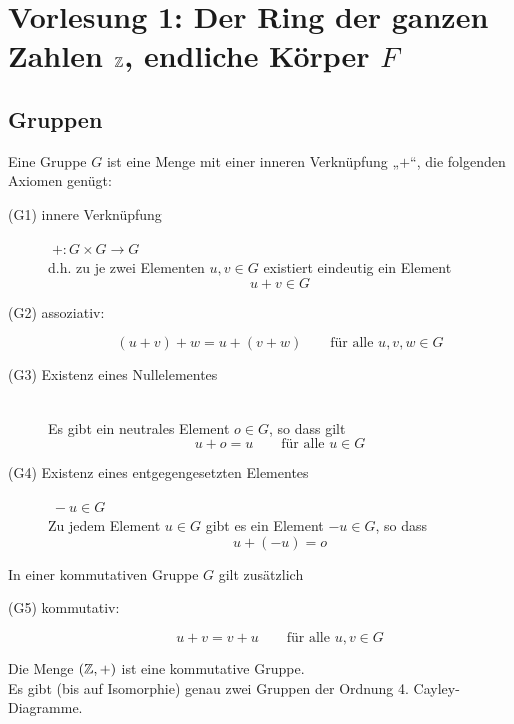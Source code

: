 
\section{Vorlesung 1: Der Ring der ganzen Zahlen $\mathbb{Z}$, endliche Körper $F$}
\subsection{Gruppen}

\begin{definition}[Gruppe]
Eine Gruppe $G$ ist eine Menge mit einer inneren Verknüpfung „$+$“, die folgenden Axiomen genügt:
\begin{description}
\item[(G1) innere Verknüpfung] $\;+ : G \times G \to G$\\
d.h. zu je zwei Elementen $u, v \in G$ existiert eindeutig ein Element
\[ u + v \in G \]
\item[(G2) assoziativ:]
\[ (u + v) + w = u + (v + w) \qquad \text{für alle } u, v, w \in G \]
\item[(G3) Existenz eines Nullelementes]\ \\
Es gibt ein neutrales Element $o \in G$, so dass gilt
\[ u + o = u \qquad \text{für alle } u \in G \]
\item[(G4) Existenz eines entgegengesetzten Elementes] $\;-u \in G$\\
Zu jedem Element $u \in G$ gibt es ein Element $-u \in G$, so dass
\[ u + (-u) = o \]
\end{description}
In einer kommutativen Gruppe $G$ gilt zusätzlich
\begin{description}
\item[(G5) kommutativ:]
\[ u + v = v + u \qquad \text{für alle } u, v \in G \]
\end{description}
\end{definition}

Die Menge $(\mathbb{Z}, +)$ ist eine kommutative Gruppe.\\
Es gibt (bis auf Isomorphie) genau zwei Gruppen der Ordnung 4. \qquad Cayley-Diagramme.

